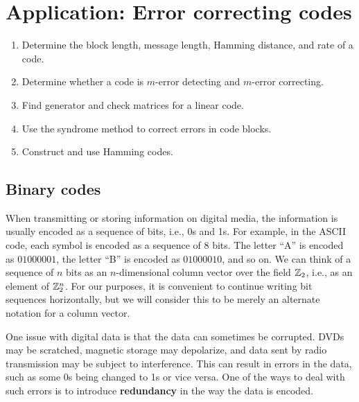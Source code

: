 \section{Application: Error correcting codes}

\begin{outcome}
  \begin{enumerate}
  \item Determine the block length, message length, Hamming distance,
    and rate of a code.
  \item Determine whether a code is $m$-error detecting and $m$-error
    correcting.
  \item Find generator and check matrices for a linear code.
  \item Use the syndrome method to correct errors in code blocks.
  \item Construct and use Hamming codes.
  \end{enumerate}
\end{outcome}

\subsection*{Binary codes}

When transmitting or storing information on digital media, the
information is usually encoded as a sequence of bits, i.e., 0s and 1s.
For example, in the ASCII code, each symbol is encoded as a sequence
of 8 bits. The letter ``A'' is encoded as $01000001$, the letter ``B''
is encoded as $01000010$, and so on. We can think of a sequence of $n$
bits as an $n$-dimensional column vector over the field $\mathbb{Z}_2$, i.e.,
as an element of $\mathbb{Z}_2^n$. For our purposes, it is convenient to
continue writing bit sequences horizontally, but we will consider this
to be merely an alternate notation for a column vector.

One issue with digital data is that the data can sometimes be
corrupted. DVDs may be scratched, magnetic storage may depolarize, and
data sent by radio transmission may be subject to interference. This
can result in errors in the data, such as some 0s being changed to 1s
or vice versa. One of the ways to deal with such errors is to
introduce \textbf{redundancy}%
%
 in the way the data is encoded.

